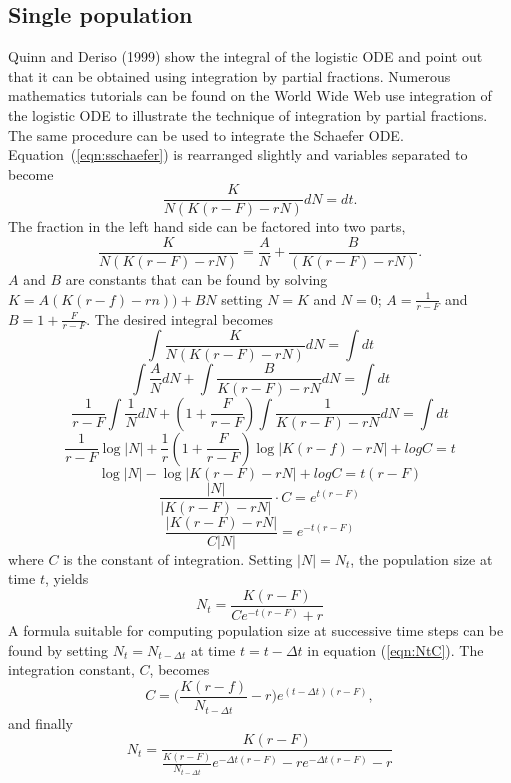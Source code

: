 \subsection{Single population}
Quinn and Deriso (1999) show the integral of the logistic ODE and
point out that it can be obtained using integration by partial fractions.
Numerous mathematics tutorials can be found on the World Wide Web use
integration of the logistic ODE to illustrate the technique of
integration by partial fractions.
The same procedure can be used to integrate the Schaefer ODE.
Equation~(\ref{eqn:sschaefer}) is rearranged slightly and variables
separated to become
\begin{equation}
\frac{K}{N(K(r-F)-rN)}dN=dt.
\end{equation}
The fraction in the left hand side can be factored into two parts,
\begin{equation}
\frac{K}{N(K(r-F)-rN)}=\frac{A}{N}+\frac{B}{(K(r-F)-rN)}.
\end{equation}
$A$ and $B$ are constants that can be found by solving
$K=A(K(r-f)-rn))+BN$
setting $N=K$ and $N=0$; 
$A=\frac{1}{r-F}$ and $B=1+\frac{F}{r-F}$.
The desired integral becomes
\[\int\frac{K}{N(K(r-F)-rN)}dN   = \int dt\]
\[\int\frac{A}{N}dN + \int\frac{B}{K(r-F)-rN}dN  = \int dt\]
\[\frac{1}{r-F}\int\frac{1}{N}dN + (1+\frac{F}{r-F})\int\frac{1}{K(r-F)-rN}dN  = \int dt\] 
\[\frac{1}{r-F}\log |N| + \frac{1}{r}(1+\frac{F}{r-F})\log |K(r-f)-rN| +log C  = t\] \[\log |N| - \log |K(r-F)-rN| + log C  = t(r-F)\]
\[\frac{|N|}{|K(r-F)-rN|}\cdot C  =  e^{t(r-F)}\]
\[\frac{|K(r-F)-rN|}{C|N|} =  e^{-t(r-F)}\]
where $C$ is the constant of integration.
Setting $|N| = N_t$, the population size at time $t$, yields
\begin{equation}
\label{eqn:NtC}
N_t=\frac{K(r-F)}{Ce^{-t(r-F)}+r}
\end{equation}
A formula suitable for computing population size at successive
time steps can be found by setting $N_t = N_{t-\Delta t}$ at time
$t=t-\Delta t$ in equation (\ref{eqn:NtC}).
The integration constant, $C$, becomes
\begin{equation}
C=\Bigg(\frac{K(r-f)}{N_{t-\Delta t}}-r\Bigg)e^{(t-\Delta t)(r-F)},
\end{equation}
and finally
\begin{equation}
\label{eqn:intschaefer}
N_t = \frac{K(r-F)}{\frac{K(r-F)}{N_{t-\Delta t}}e^{-\Delta t(r-F)}-re^{-\Delta t(r-F)} -r}
\end{equation}

